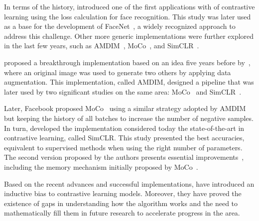 \documentclass[12pt]{article}
\begin{document}
In terms of the history, \citet{chopra2005} introduced one of the first applications with  of contrastive learning using the loss calculation for face recognition. This study was later used as a base for the development of FaceNet~\citep{schroff2015}, a widely recognized approach to address this challenge. Other more generic implementations were further explored in the last few years, such as AMDIM~\citep{bachman2019}, MoCo~\citep{he2020}, and SimCLR~\citep{chen2020}.

\citet{bachman2019} proposed a breakthrough implementation based on an idea five years before by~\citet{dosovitskiy2016}, where an original image was used to generate two others by applying data augmentation. This implementation, called AMDIM, designed a pipeline that was later used by two significant studies on the same area: MoCo~\citep{he2020} and SimCLR~\citep{chen2020}.

Later, Facebook proposed MoCo~\citep{he2020} using a similar strategy adopted by AMDIM but keeping the history of all batches to increase the number of negative samples.
In turn, \citet{chen2020} developed the implementation considered today the state-of-the-art in contrastive learning, called SimCLR. This study presented the best accuracies, equivalent to supervised methods when using the right number of parameters. The second version proposed by the authors presents essential improvements~\citep{chen2020.2}, including the memory mechanism initially proposed by MoCo~\citep{he2020}.

Based on the recent advances and successful implementations, \citet{saunshi2022} have introduced an inductive bias to contrastive learning models. Moreover, they have proved the existence of gaps in understanding how the algorithm works and the need to mathematically fill them in future research to accelerate progress in the area.


\end{document}
